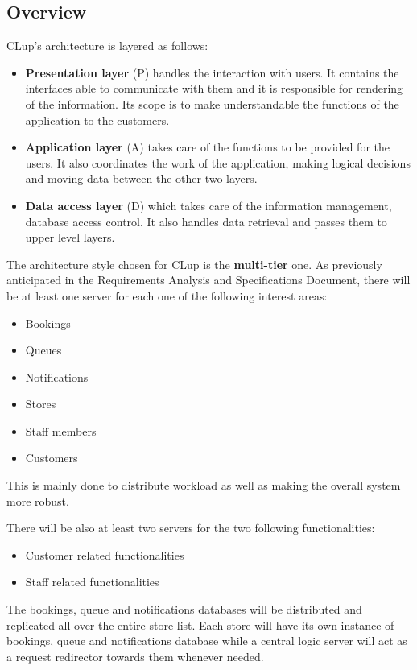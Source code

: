 \subsection{Overview}
CLup's architecture is layered as follows:
\begin{itemize}
	\item \textbf{Presentation layer} (P) handles the interaction with users. It contains the interfaces able to communicate with them and it is responsible for rendering of the information. Its scope is to make understandable the functions of the application to the customers.
	\item \textbf{Application layer} (A) takes care of the functions to be provided for the users. It also coordinates the work of the application, making logical decisions and moving data between	the other two layers.
	\item \textbf{Data access layer }(D) which takes care of the information management, database access control. It also handles data retrieval and passes them to upper level layers.
\end{itemize}
 
The architecture style chosen for CLup is the \textbf{multi-tier} one.
As previously anticipated in the Requirements Analysis and Specifications Document, there will be at least one server for each one of the following interest areas:
\begin{itemize}
    \item Bookings
    \item Queues
    \item Notifications
    \item Stores
    \item Staff members
    \item Customers
\end{itemize}

This is mainly done to distribute workload as well as making the overall system more robust.

There will be also at least two servers for the two following functionalities:
\begin{itemize}
    \item Customer related functionalities
    \item Staff related functionalities
\end{itemize}
The bookings, queue and notifications databases will be distributed and replicated all over the entire store list. Each store will have its own instance of bookings, queue and notifications database while a central logic server will act as a request redirector towards them whenever needed.\\

